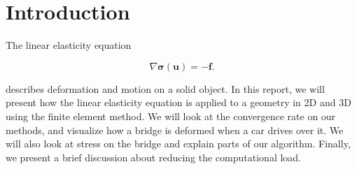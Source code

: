 \section{Introduction}



The linear elasticity equation

\begin{equation}
\label{eq:linEl}
\nabla \bm{\sigma}(\bm{u}) = - \bm{f}.
\end{equation}

describes deformation and motion on a solid object. In this report, we will present how the linear elasticity equation is applied to a geometry in 2D and 3D using the finite element method. We will look at the convergence rate on our methods, and visualize how a bridge is deformed when a car drives over it. We will also look at stress on the bridge and explain parts of our algorithm. Finally, we present a brief discussion about reducing the computational load.